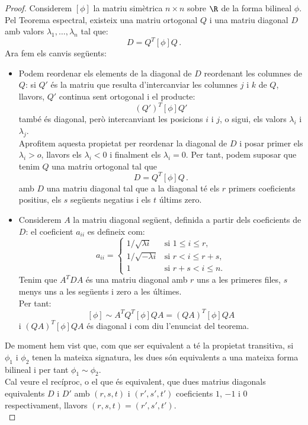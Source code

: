 \begin{proof}
Considerem $[\phi]$ la matriu simètrica $n\times n$ sobre $\R$ de la forma bilineal $\phi$. Pel Teorema espectral, existeix una matriu ortogonal $Q$  i una matriu diagonal $D$ amb valors $\lambda_1, \dots, \lambda_n$ tal que:
\[
D=Q^T [\phi] Q \,.
\]
Ara fem els canvis següents:
\begin{itemize}
    \item Podem reordenar els elements de la diagonal de $D$ reordenant les columnes de $Q$: si $Q'$ és la matriu que resulta d'intercanviar les columnes $j$ i $k$ de $Q$, llavors, $Q'$ continua sent ortogonal i el producte:
    \[
    (Q')^T[\phi]Q'
    \]
    també és diagonal, però intercanviant les posicions $i$ i $j$, o sigui, els valors $\lambda_i$ i $\lambda_j$.\\
    Aprofitem aquesta propietat per reordenar la diagonal de $D$ i posar primer els $\lambda_i>o$, llavors els $\lambda_i<0$ i finalment els $\lambda_i=0$. Per tant, podem suposar que tenim $Q$ una matriu ortogonal tal que
    \[
    D=Q^T [\phi] Q \,.
    \]
    amb $D$ una matriu diagonal tal que a la diagonal té els $r$ primers coeficients positius, els $s$ següents negatius i els $t$ últims zero.
    \item Considerem $A$ la matriu diagonal següent, definida a partir dels coeficients de $D$: el coeficient $a_{ii}$ es defineix com:
    \[
    a_{ii}=\begin{cases}
    1/\sqrt{\lambda i} & \text{si $1\leq i \leq r$,} \\
    1/\sqrt{-\lambda i} & \text{si $r < i \leq r+s$,} \\
    1 & \text{si $r+s < i \leq n$.}
    \end{cases}
    \]
    Tenim que $A^TDA$ és una matriu diagonal amb $r$ uns a les primeres files, $s$ menys uns a les següents i zero a les últimes.\\
    Per tant:
    \[
    [\phi] \sim A^TQ^T [\phi] QA = (QA)^T [\phi] QA
    \]
    i $(QA)^T [\phi] QA$ és diagonal i com diu l'enunciat del teorema.
\end{itemize}
De moment hem vist que, com que ser equivalent a té la propietat transitiva, si $\phi_1$ i $\phi_2$ tenen la mateixa signatura, les dues són equivalents a una mateixa forma bilineal i per tant $\phi_1\sim \phi_2$.\\
Cal veure el recíproc, o el que és equivalent, que dues matrius diagonals equivalents $D$ i $D'$ amb $(r,s,t)$ i $(r',s',t')$ coeficients $1$, $-1$ i $0$ respectivament, llavors $(r,s,t)=(r',s',t')$. \\

\end{proof}
